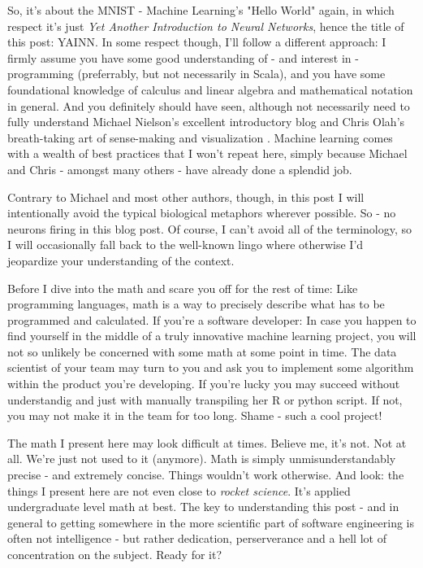 \documentclass[]{report}
\begin{document}
So, it's about the MNIST - Machine Learning's "Hello World" again, in which respect it's just \emph{Yet Another Introduction to Neural Networks}, hence the title of this post: YAINN. In some respect though, I'll follow a different approach: I firmly assume you have some good understanding of - and interest in - programming (preferrably, but not necessarily in Scala), and you have some foundational knowledge of calculus and linear algebra and mathematical notation in general. And you definitely should have seen, although not necessarily need to fully understand Michael Nielson's excellent introductory blog \cite{nielson2015} and Chris Olah's breath-taking art of sense-making and visualization \cite{olah2015}. Machine learning comes with a wealth of best practices that I won't repeat here, simply because Michael and Chris - amongst many others - have already done a splendid job. 

Contrary to Michael and most other authors, though, in this post I will intentionally avoid the typical biological metaphors wherever possible. So - no neurons firing in this blog post. Of course, I can't avoid all of the terminology, so I will occasionally fall back to the well-known lingo where otherwise I'd jeopardize your understanding of the context.

\bigskip

Before I dive into the math and scare you off for the rest of time: Like programming languages, math is a way to precisely describe what has to be programmed and calculated. If you're a software developer: In case you happen to find yourself in the middle of a truly innovative machine learning project, you will not so unlikely be concerned with some math at some point in time. The data scientist of your team may turn to you and ask you to implement some algorithm within the product you're developing. If you're lucky you may succeed without understandig and just with manually transpiling her R or python script. If not, you may not make it in the team for too long. Shame - such a cool project!

The math I present here may look difficult at times. Believe me, it's not. Not at all. We're just not used to it (anymore). Math is simply unmisunderstandably precise - and extremely concise. Things wouldn't work otherwise. And look: the things I present here are not even close to \emph{rocket science}. It's applied undergraduate level math at best. The key to understanding this post - and in general to getting somewhere in the more scientific part of software engineering is often not intelligence - but rather dedication, perserverance and a hell lot of concentration on the subject. Ready for it?
\end{document}
